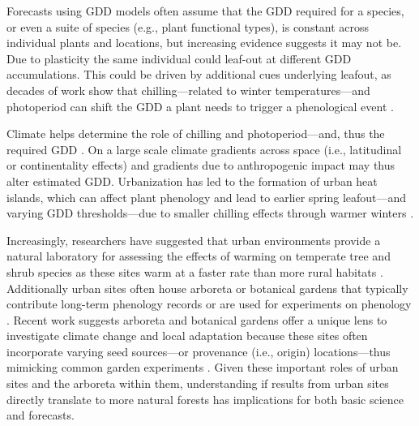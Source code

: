 \documentclass{article}\usepackage[]{graphicx}\usepackage[]{color}
\newcommand{\R}[1]{\label{#1}\linelabel{#1}}
\begin{document}
Forecasts using GDD models often assume that the GDD required for a species, or even a suite of species (e.g., plant functional types), is constant across individual plants and locations, but increasing evidence suggests it may not be. Due to plasticity the same individual could leaf-out at different GDD accumulations. This could be driven by additional cues underlying leafout, as decades of work show that chilling---related to winter temperatures---and photoperiod can shift the GDD a plant needs to trigger a phenological event \citep{Basler2012,Chuine2010,Zohner2016}. 

\R{Z4urban}Climate helps determine the role of chilling and photoperiod---and, thus the required GDD \citep{Bonhomme2000,Wu2022}. On a large scale climate gradients across space (i.e., latitudinal or continentality effects) and gradients due to anthropogenic impact may thus alter estimated GDD. Urbanization has led to the formation of urban heat islands, which can affect plant phenology and lead to earlier spring leafout---and varying GDD thresholds---due to smaller chilling effects through warmer winters \citep{Meng2020}.\R{Z4urbanend}


Increasingly, researchers have suggested that urban environments provide a natural laboratory for assessing the effects of warming on temperate tree and shrub species as these sites warm at a faster rate than more rural habitats \citep{Grimm2008,Pickett2011}. Additionally urban sites often house arboreta or botanical gardens that typically contribute long-term phenology records \citep{Zohner2014} or are used for experiments on phenology \citep{Ettinger2018}. Recent work suggests arboreta and botanical gardens offer a unique lens to investigate climate change and local adaptation because these sites often incorporate varying seed sources---or provenance (i.e., origin) locations---thus mimicking common garden experiments \citep{Primack2009}. Given these important roles of urban sites and the arboreta within them, understanding if results from urban sites directly translate to more natural forests has implications for both basic science and forecasts.  
\end{document}
